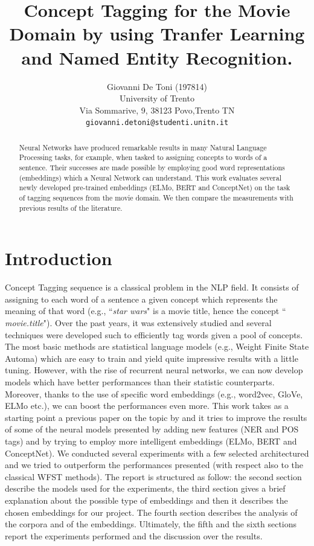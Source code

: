 \documentclass[11pt,a4paper]{article}
\title{Concept Tagging for the Movie Domain by using Tranfer Learning and Named Entity Recognition.}
\author{Giovanni De Toni (197814) \\
  University of Trento \\ Via Sommarive, 9, 38123 Povo,Trento TN\\
  \texttt{giovanni.detoni@studenti.unitn.it}}
\date{}
\begin{document}
\maketitle

\begin{abstract}
Neural Networks have produced remarkable results in many Natural Language Processing tasks, for example, when tasked to assigning concepts to words of a sentence. Their successes are made possible by employing good word representations (embeddings) which a Neural Network can understand. This work evaluates several newly developed pre-trained embeddings (ELMo, BERT and ConceptNet) on the task of tagging sequences from the movie domain. We then compare the measurements with previous results of the literature.
\end{abstract}

\section{Introduction}
Concept Tagging sequence is a classical problem in 
the NLP field. It consists of assigning to each word 
of a sentence a given concept which represents the 
meaning of that word (e.g., ``\textit{star wars}" is 
a movie title, hence the concept ``
\textit{movie.title}"). Over the past years, it was 
extensively studied and several techniques were 
developed such to efficiently tag words given a pool 
of concepts. The most basic methods are statistical 
language models (e.g., Weight Finite State Automa) 
which are easy to train and yield quite impressive 
results with a little tuning. However, with the rise 
of recurrent neural networks, we can now develop 
models which have better performances than their 
statistic counterparts. Moreover, thanks to the use 
of specific word embeddings (e.g., word2vec, GloVe, 
ELMo etc.), we can boost the performances even more.
This work takes as a starting point a previous paper 
on the topic by \citet{gobbi} and it tries to improve 
the results of some of the neural models presented 
by adding new features (NER and POS tags) and 
by trying to employ more intelligent embeddings 
(ELMo, BERT and ConceptNet). We conducted several experiments with a few selected architectured and we tried to outperform the performances presented (with respect also to the classical WFST methods).  The report is 
structured as follow: the second section describe 
the models used for the experiments, the third section gives a brief explanation about the possible type of embeddings and then it describes the chosen embeddings for our project.  The fourth section describes the analysis of the 
corpora and of the embeddings. Ultimately,  the fifth
and the sixth sections report the experiments 
performed and the discussion over the results.
 	
\end{document}
